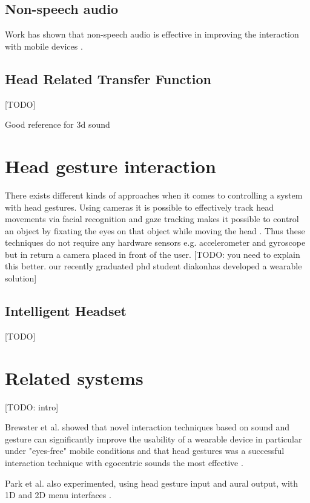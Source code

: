 \subsection{Non-speech audio}
Work has shown that non-speech audio is effective in improving the interaction with mobile devices \cite{pirhonen_gestural_2002, sawhney_nomadic_2000}.

\subsection{Head Related Transfer Function}
[TODO]

Good reference for 3d sound \cite{begault_3dd_1994}


\section{Head gesture interaction}
There exists different kinds of approaches when it comes to controlling a system with head gestures. Using cameras it is possible to effectively track head movements via facial recognition \cite{morimoto_recognition_1996} and gaze tracking makes it possible to control an object by fixating the eyes on that object while moving the head \cite{mardanbegi_eye-based_2012}. Thus these techniques do not require any hardware sensors e.g. accelerometer and gyroscope but in return a camera placed in front of the user. [TODO: you need to explain this better. our recently graduated phd student diakonhas developed a wearable solution]

\subsection{Intelligent Headset}
[TODO]


\section{Related systems}
[TODO: intro]

Brewster et al. showed that novel interaction techniques based on sound and gesture can significantly improve the usability of a wearable device in particular under "eyes-free" mobile conditions and that head gestures was a successful interaction technique with egocentric sounds the most effective \cite{brewster_multimodaleyes-freeinteraction_2003}.

Park et al. also experimented, using head gesture input and aural output, with 1D and 2D menu interfaces \cite{park_gaze-directed_2011}.


